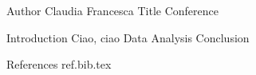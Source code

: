 Author Claudia Francesca	
Title Conference

Introduction Ciao, ciao
Data
Analysis
Conclusion

References 
ref.bib.tex
